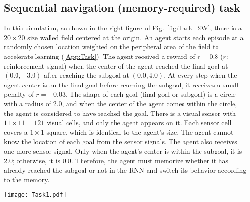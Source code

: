 \subsection{Sequential navigation (memory-required) task}
In this simulation, as shown in the right figure of Fig.~\ref{fig:Task_SW},
there is a $20 \times 20$ size walled field centered at the origin.
An agent starts each episode at a randomly chosen location
weighted on the peripheral area of the field to accelerate learning (\ref{App:Task}).
The agent received a reward of $r=0.8$ ($r$: reinforcement signal)
when the center of the agent reached the final goal at $(0.0, -3.0)$ after reaching the subgoal at $(0.0, 4.0)$.
At every step when the agent center is on the final goal before reaching the subgoal,
it receives a small penalty of $r=-0.03$.
The shape of each goal (final goal or subgoal) is a circle with a radius of 2.0, 
and when the center of the agent comes within the circle, the agent is considered to have reached the goal.
There is a visual sensor with $11 \times 11=121$ visual cells, and only the agent appears on it.
Each sensor cell covers a $1 \times 1$ square, which is identical to the agent's size.
The agent cannot know the location of each goal from the sensor signals.
The agent also receives one more sensor signal.
Only when the agent's center is within the subgoal, it is 2.0; otherwise, it is 0.0.
Therefore, the agent must memorize whether it has already reached the subgoal or not in the RNN
and switch its behavior according to the memory.
\begin{figure*}[th]
\centerline{\texttt{[image: Task1.pdf]}}
\caption{Sequential navigation task and the RNN used in the simulation.}
\label{fig:Task_SW}
\end{figure*}

